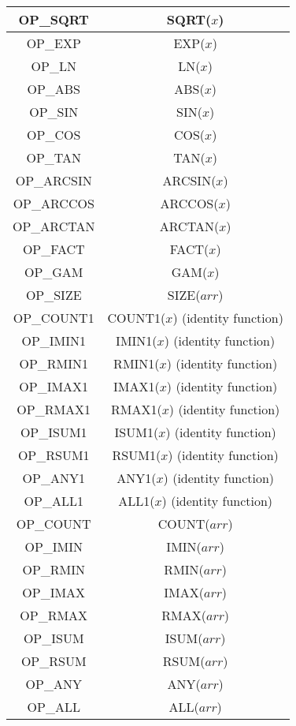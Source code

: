 \starttab
\begin{tabular}{|c|c|}
\hline OP\_SQRT     & SQRT($x$) \\
\hline OP\_EXP      & EXP($x$) \\
\hline OP\_LN       & LN($x$) \\
\hline OP\_ABS      & ABS($x$) \\
\hline OP\_SIN      & SIN($x$) \\
\hline OP\_COS      & COS($x$) \\
\hline OP\_TAN      & TAN($x$) \\
\hline OP\_ARCSIN   & ARCSIN($x$) \\
\hline OP\_ARCCOS   & ARCCOS($x$) \\
\hline OP\_ARCTAN   & ARCTAN($x$) \\
\hline OP\_FACT     & FACT($x$) \\
\hline OP\_GAM      & GAM($x$) \\
\hline OP\_SIZE     & SIZE($arr$) \\
\hline OP\_COUNT1   & COUNT1($x$) (identity function) \\
\hline OP\_IMIN1    & IMIN1($x$) (identity function) \\
\hline OP\_RMIN1    & RMIN1($x$) (identity function) \\
\hline OP\_IMAX1    & IMAX1($x$) (identity function) \\
\hline OP\_RMAX1    & RMAX1($x$) (identity function) \\
\hline OP\_ISUM1    & ISUM1($x$) (identity function) \\
\hline OP\_RSUM1    & RSUM1($x$) (identity function) \\
\hline OP\_ANY1     & ANY1($x$) (identity function) \\
\hline OP\_ALL1     & ALL1($x$) (identity function) \\
\hline OP\_COUNT    & COUNT($arr$) \\
\hline OP\_IMIN     & IMIN($arr$) \\
\hline OP\_RMIN     & RMIN($arr$) \\
\hline OP\_IMAX     & IMAX($arr$) \\
\hline OP\_RMAX     & RMAX($arr$) \\
\hline OP\_ISUM     & ISUM($arr$) \\
\hline OP\_RSUM     & RSUM($arr$) \\
\hline OP\_ANY      & ANY($arr$) \\
\hline OP\_ALL      & ALL($arr$) \\
\hline
\end{tabular}

